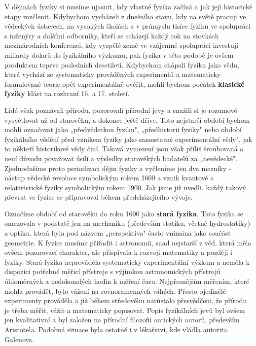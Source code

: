 
      V dějinách fyziky si musíme ujasnit, kdy vlastně fyzika začíná a jak její historické etapy
      rozčlenit. Kdybychom vycházeli z dnešního stavu, kdy na světě pracuji ve vědeckých ústavech,
      na vysokých školách a v průmyslu tisíce fyziků ve spolupráci s inženýry a dalšími odborníky,
      kteří se scházejí každý rok na stovkách mezinárodních konferenci, kdy vyspělé země ve vzájemné
      spolupráci investují miliardy dolarů do fyzikálního výzkumu, pak fyzika v této podobě je ovšem
      produktem teprve posledních desetiletí. Kdybychom chápali fyziku jako vědu, která vychází ze
      systematicky prováděných experimentů a matematicky formulované teorie opět experimentálně
      ověřit, mohli bychom počátek \textbf{klasické fyziky} klást na rozhraní 16. a 17. století.

      Lidé však poznávali přírodu, pozorovali přírodní jevy a snažili si je rozumově vysvětlovat už
      od starověku, a dokonce ještě dříve. Toto nejstarší období bychom mohli označovat jako
      „předvědeckou fyziku", „předhistorii fyziky" nebo období fyzikálního vědění před vznikem
      fyziky jako samostatné experimentální vědy", jak to někteří historikové vědy činí. Taková
      vymezení jsou však příliš šroubovaná a není důvodu považovat úsilí a výsledky starověkých
      badatelů za „nevědecké". Zjednodušíme proto periodizaci dějin fyziky a vyčleníme jen dva
      mezníky - nástup vědecké revoluce symbolickým rokem 1600 a vznik kvantové a relativistické
      fyziky symbolickým rokem 1900. Jak jsme již uvedli. každý takový převrat ve fyzice se
      připravoval během předcházejícího vývoje.


      Označíme období od starověku do roku 1600 jako \textbf{stará fyzika}. Tato fyzika se omezovala
      v podstatě jen na mechaniku (především statiku, včetně hydrostatiky) a optiku, která byla pod
      názvem „perspektiva" často vnímána jako součást geometrie. K fyzice musíme přiřadit i
      astronomii, snad nejstarší z věd, která měla ovšem pozorovací charakter, ale přispívala k
      rozvoji matematiky a později i fyziky. Stará fyzika neprováděla systematický experimentální
      výzkum a neměla k dispozici potřebné měřicí přístroje s výjimkou astronomických přístrojů
      úhloměrných a nedokonalých hodin k měření času. Nejpřesnějším měřením, které mohla provádět,
      bylo vážení na rovnoramenných váhách. Přesto ojedinělé experimenty prováděla a již během
      středověku narůstalo přesvědčeni, že přírodu je třeba měřit, vážit a matematicky popisovat.
      Popis fyzikálních jevů byl ovšem jen kvalitativní a byl založen na přírodní filozofii
      antických autorů, především Aristotela. Podobná situace byla ostatně i v lékařství, kde vládla
      autorita Galenova.

